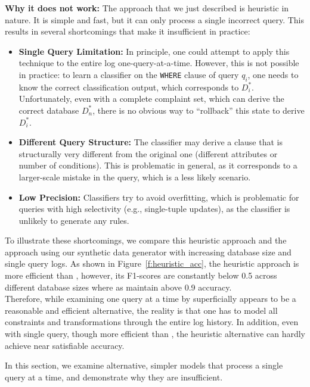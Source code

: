 \smallskip
\noindent
\textbf{Why it does not work:}
The approach that we just described is heuristic in nature. It
is simple and fast, but it can only process a single incorrect query.
This results in several shortcomings that make it insufficient in
practice:
\begin{itemize}[itemsep=1pt, leftmargin=5mm]
    
\item \textbf{Single Query Limitation: }
In principle, one could attempt to apply this technique to the
entire log one-query-at-a-time. However, this is not possible in
practice: to learn a classifier on the \texttt{WHERE} clause of query
$q_i$, one needs to know the correct classification output, which
corresponds to $D_i^*$. Unfortunately, even with a complete complaint
set, which can derive the correct database $D_n^*$, there is no
obvious way to ``rollback'' this state to derive $D_i^*$.

\item \textbf{Different Query Structure: } 
The classifier may derive a clause that is structurally very
different from the original one (different attributes or number of
conditions). This is problematic in general, as it corresponds to a
larger-scale mistake in the query, which is a less likely scenario.

\item \textbf{Low Precision: }
Classifiers try to avoid overfitting, which is problematic for
queries with high selectivity (e.g., single-tuple updates), as the
classifier is unlikely to generate any rules.
\end{itemize}

To illustrate these shortcomings, we compare this heuristic approach and the \sys approach
using our synthetic data generator with increasing database size 
and single query logs. As shown in Figure~\ref{f:heuristic_acc}, the heuristic approach
is more efficient than \sys, however, its
F1-scores are constantly below 0.5 across
different database sizes where as \sys maintain above 0.9 accuracy. \\
Therefore, while examining one query at a time by  
superficially appears
to be a reasonable and efficient alternative, 
the reality is that one
has to model all constraints and transformations through the entire
log history. In addition, even with single query, though more efficient than \sys, 
the heuristic alternative can hardly achieve near satisfiable accuracy. 

\iffalse
In this
section, we examine alternative, simpler models that process a single
query at a time, and demonstrate why they are insufficient.


